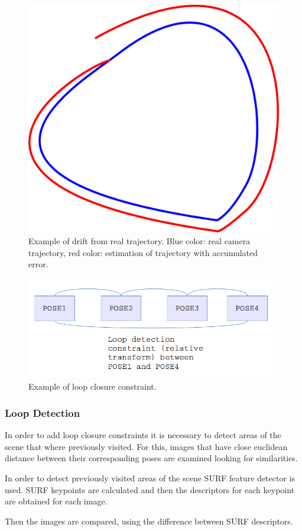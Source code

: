 \begin{figure}[!h]
\begin{center}
\includegraphics[scale=0.35]{images/drift}
\caption{Example of drift from real trajectory. Blue color: real camera trajectory, red color: estimation of trajectory with accumulated error.}
\end{center}
\end{figure}

\begin{figure}[!h]
\begin{center}
\includegraphics[scale=0.65]{images/loop_detection}
\caption{Example of loop closure constraint.}
\end{center}
\end{figure}

\subsubsection{Loop Detection}

In order to add loop closure constraints it is necessary to detect areas of the scene 
 that where previously visited. For this, images that have close euclidean distance between 
their corresponding poses are examined looking for similarities.

In order to detect previously visited areas of the scene SURF \cite{Bay06surf} feature detector 
is used. SURF keypoints are calculated and then the descriptors for each keypoint are obtained for 
each image.

 Then  the images are compared, using the difference between SURF descriptors.   

